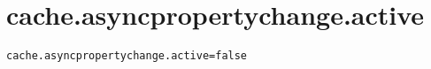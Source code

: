 \section{cache.asyncpropertychange.active}
\label{configuration:CacheAsyncpropertychangeActive}
\ClearAPI
\TODO
{}
\begin{lstlisting}[style=Props,caption={Usage example for \textit{cache.asyncpropertychange.active}}]
cache.asyncpropertychange.active=false
\end{lstlisting}